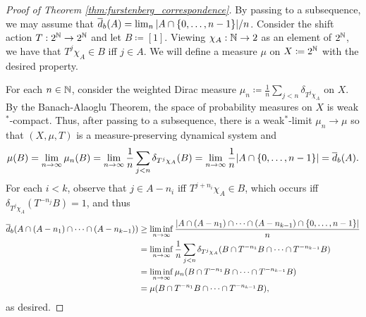 \documentclass[reqno, twoside]{article}
\begin{document}
    \begin{proof}[Proof of Theorem \ref{thm:furstenberg_correspondence}]
        By passing to a subsequence, we may assume that $\overline{d}_b(A)=\lim_n|A\cap\left\{0,\dots,n-1\right\}\!|/n$. Consider the shift action $T:2^{\mathbb{N}}\to2^{\mathbb{N}}$ and let $B\coloneqq[1]$. Viewing $\chi_A:\mathbb{N}\to2$ as an element of $2^{\mathbb{N}}$, we have that $T^j\chi_A\in B$ iff $j\in A$. We will define a measure $\mu$ on $X\coloneqq2^{\mathbb{N}}$ with the desired property.

        For each $n\in\mathbb{N}$, consider the weighted Dirac measure $\mu_n\coloneqq\frac{1}{n}\sum_{j<n}\delta_{T^j\chi_A}$ on $X$. By the Banach-Alaoglu Theorem, the space of probability measures on $X$ is weak$^\ast$-compact. Thus, after passing to a subsequence, there is a weak$^\ast$-limit $\mu_n\to\mu$ so that $(X,\mu,T)$ is a measure-preserving dynamical system and
        \vspace{-0.05in}
        \begin{equation*}
            \mu(B)=\lim_{n\to\infty}\mu_n(B)=\lim_{n\to\infty}\frac{1}{n}\sum_{j<n}\delta_{T^j\chi_A}(B)=\lim_{n\to\infty}\frac{1}{n}|A\cap\l\{0,\dots,n-1\r\}\!|=\bar{d}_b(A).
            \vspace{-0.05in}
        \end{equation*}
        For each $i<k$, observe that $j\in A-n_i$ iff $T^{j+n_i}\chi_A\in B$, which occurs iff $\delta_{T^j\chi_A}(T^{-n_j}B)=1$, and thus
        \vspace{-0.05in}
        \begin{equation*}
            \begin{aligned}
                \bar{d}_b(A\cap(A-n_1)\cap\cdots\cap(A-n_{k-1}))&\geq\liminf_{n\to\infty}\frac{|A\cap(A-n_1)\cap\cdots\cap(A-n_{k-1})\cap\l\{0,\dots,n-1\r\}\!|}{n} \\
                                                                           &=\liminf_{n\to\infty}\frac{1}{n}\sum_{j<n}\delta_{T^j\chi_A}(B\cap T^{-n_1}B\cap\cdots\cap T^{-n_{k-1}}B) \\
                                                                           &=\liminf_{n\to\infty}\mu_n(B\cap T^{-n_1}B\cap\cdots\cap T^{-n_{k-1}}B) \\
                                                                           &=\mu(B\cap T^{-n_1}B\cap\cdots\cap T^{-n_{k-1}}B),
            \end{aligned}
            \vspace{-0.05in}
        \end{equation*}
        as desired.
    \end{proof}
\end{document}
